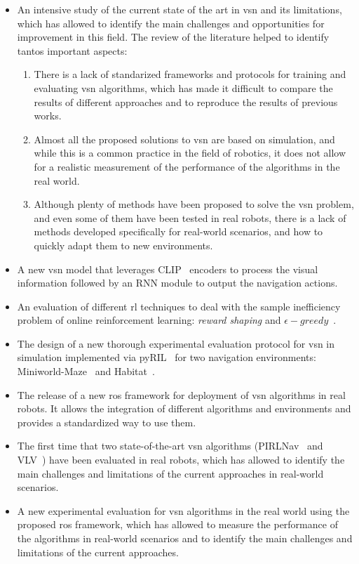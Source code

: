 \begin{itemize}
    \item An intensive study of the current state of the art in \acrshort{vsn} and its limitations, which has allowed to identify the main challenges and opportunities for improvement in this field.
    The review of the literature helped to identify tantos important aspects:
        \begin{enumerate}
            \item There is a lack of standarized frameworks and protocols for training and evaluating \acrshort{vsn} algorithms, which has made it difficult to compare the results of different approaches and to reproduce the results of previous works.
            \item Almost all the proposed solutions to \acrshort{vsn} are based on simulation, and while this is a common practice in the field of robotics, it does not allow for a realistic measurement of the performance of the algorithms in the real world.
            \item Although plenty of methods have been proposed to solve the \acrshort{vsn} problem, and even some of them have been tested in real robots, there is a lack of methods developed specifically for real-world scenarios, and how to quickly adapt them to new environments.
        \end{enumerate}
    \item A new \acrshort{vsn} model that leverages CLIP~\cite{radford2021} encoders to process the visual information followed by an RNN module to output the navigation actions.
    \item An evaluation of different \acrshort{rl} techniques to deal with the sample inefficiency~\cite{Yarats2019ImprovingSE} problem of online reinforcement learning: \textit{reward shaping} and $\epsilon-greedy$~\cite{mnih2013}.
    \item The design of a new thorough experimental evaluation protocol for \acrshort{vsn} in simulation implemented via pyRIL~\cite{pyRIL} for two navigation environments: Miniworld-Maze~\cite{gym_miniworld} and Habitat~\cite{szot2021}.
    \item The release of a new \acrshort{ros} framework for deployment of \acrshort{vsn} algorithms in real robots.
    It allows the integration of different algorithms and environments and provides a standardized way to use them.
    \item The first time that two state-of-the-art \acrshort{vsn} algorithms (PIRLNav~\cite{ramrakhya2023} and VLV~\cite{chang2020}) have been evaluated in real robots, which has allowed to identify the main challenges and limitations of the current approaches in real-world scenarios.
    \item A new experimental evaluation for \acrshort{vsn} algorithms in the real world using the proposed \acrshort{ros} framework, which has allowed to measure the performance of the algorithms in real-world scenarios and to identify the main challenges and limitations of the current approaches.
\end{itemize}

